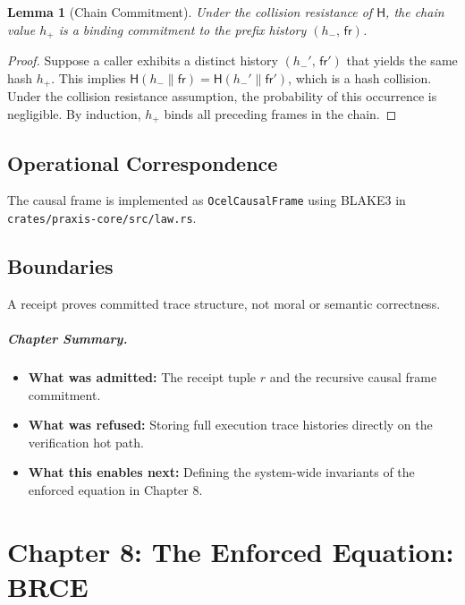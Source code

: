 \documentclass[11pt,oneside]{book}
\theoremstyle{definition}
\theoremstyle{plain}
\newtheorem{lemma}[theorem]{Lemma}
\theoremstyle{remark}
\newcommand{\chainH}{\mathsf{H}}               %
\newcommand{\code}[1]{\texttt{#1}}
\begin{document}
\begin{lemma}[Chain Commitment]\label{lem:chain_commit}
Under the collision resistance of $\chainH$, the chain value $h_+$ is a binding commitment to the prefix history $(h_-,\, \mathsf{fr})$. %
\end{lemma}

\begin{proof}
Suppose a caller exhibits a distinct history $(h_-',\, \mathsf{fr}')$ that yields the same hash $h_+$. %
This implies $\chainH(h_- \parallel \mathsf{fr}) = \chainH(h_-' \parallel \mathsf{fr}')$, which is a hash collision. %
Under the collision resistance assumption, the probability of this occurrence is negligible. %
By induction, $h_+$ binds all preceding frames in the chain. %
\end{proof}

\section{Operational Correspondence}
The causal frame is implemented as \code{OcelCausalFrame} using BLAKE3 in \code{crates/praxis-core/src/law.rs}. %

\section{Boundaries}
A receipt proves committed trace structure, not moral or semantic correctness. %

\paragraph{Chapter Summary.}
\begin{itemize}
  \item \textbf{What was admitted:} The receipt tuple $r$ and the recursive causal frame commitment. %
  \item \textbf{What was refused:} Storing full execution trace histories directly on the verification hot path. %
  \item \textbf{What this enables next:} Defining the system-wide invariants of the enforced equation in Chapter 8. %
\end{itemize}

\chapter{Chapter 8: The Enforced Equation: BRCE}
\label{ch:brce}
\end{document}
